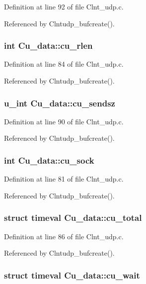 Definition at line 92 of file Clnt\_\-udp.c.

Referenced by Clntudp\_\-bufcreate().
\subsubsection{\setlength{\rightskip}{0pt plus 5cm}int {\bf Cu\_\-data::cu\_\-rlen}}\label{structCu__data_o3}




Definition at line 84 of file Clnt\_\-udp.c.

Referenced by Clntudp\_\-bufcreate().
\subsubsection{\setlength{\rightskip}{0pt plus 5cm}u\_\-int {\bf Cu\_\-data::cu\_\-sendsz}}\label{structCu__data_o9}




Definition at line 90 of file Clnt\_\-udp.c.

Referenced by Clntudp\_\-bufcreate().
\subsubsection{\setlength{\rightskip}{0pt plus 5cm}int {\bf Cu\_\-data::cu\_\-sock}}\label{structCu__data_o0}




Definition at line 81 of file Clnt\_\-udp.c.

Referenced by Clntudp\_\-bufcreate().
\subsubsection{\setlength{\rightskip}{0pt plus 5cm}struct timeval {\bf Cu\_\-data::cu\_\-total}}\label{structCu__data_o5}




Definition at line 86 of file Clnt\_\-udp.c.

Referenced by Clntudp\_\-bufcreate().
\subsubsection{\setlength{\rightskip}{0pt plus 5cm}struct timeval {\bf Cu\_\-data::cu\_\-wait}}\label{structCu__data_o4}




